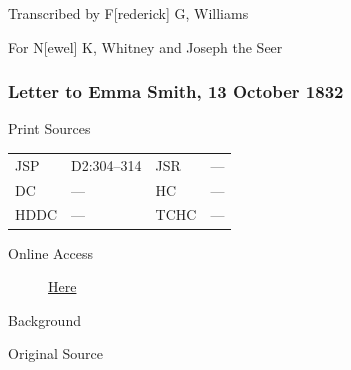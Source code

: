 				\begin{tightcenter}
				Transcribed by F[rederick] G, Williams
				
				For N[ewel] K, Whitney and Joseph the Seer 
				\end{tightcenter}
				
		\subsubsection{Letter to Emma Smith, 13 October 1832}
			\label{EMS-1832-JS-13-OCT-1832}
		
			\begin{description}
				\item[Print Sources]
			\end{description}

				\begin{tabular}{p{0.5in}p{1in}p{0.5in}p{1in}}
				JSP	 	& D2:304--314		& JSR 		& --- \\
				DC	 	& ---	 	& HC 		& --- \\
				HDDC 	& ---		& TCHC 		& --- \\
				\end{tabular}
			
			\begin{description}
				\item[Online Access] \href{https://www.josephsmithpapers.org/paper-summary/letter-to-emma-smith-13-october-1832/1}{Here}
			\end{description}
			
			\begin{description}
				\item[Background]
			\end{description}
			
			
			\begin{description}
				\item[Original Source]
			\end{description}
			
